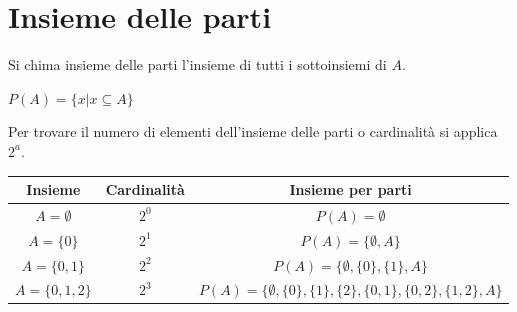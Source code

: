 \section{Insieme delle parti}
\begin{definition}
    Si chima insieme delle parti l'insieme di tutti i sottoinsiemi di $A$.\begin{center}$P(A) = \{x|x\subseteq A\}$\end{center}
\end{definition}
Per trovare il numero di elementi dell'insieme delle parti o cardinalità si applica $2^a$.
\begin{center}
    \begin{tabular}{c|c c}
        \centering
        Insieme & Cardinalità & Insieme per parti \\\hline
        $A=\emptyset$&$2^0$&$P(A)=\emptyset$\\\hline
        $A=\{0\}$&$2^1$&$P(A)=\{\emptyset,A\}$\\\hline
        $A=\{0,1\}$&$2^2$&$P(A)=\{\emptyset,\{0\},\{1\},A\}$\\\hline
        $A=\{0,1,2\}$&$2^3$&$P(A)=\{\emptyset,\{0\},\{1\},\{2\},\{0,1\},\{0,2\},\{1,2\},A\}$
    \end{tabular}
\end{center}